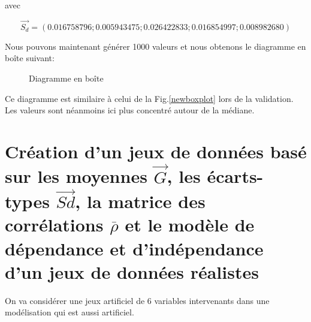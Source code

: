 \documentclass[a4paper]{article}
\begin{document}
\begin{appendices}
\begin{figure}[H]
\begin{tabular}{llll}
\end{tabular}
\end{figure}

avec 

$$\vec{S_{d}}=(0.016758796; 0.005943475; 0.026422833; 0.016854997; 0.008982680)$$

Nous pouvons maintenant générer 1000 valeurs et nous obtenons le diagramme en boîte suivant:

 \begin{figure}[H] 
    \center 
    \caption{Diagramme en boîte } 
\end{figure} 

Ce diagramme est similaire à celui de la Fig.\ref{newboxplot}  lors de la validation. Les valeurs sont néanmoins ici plus concentré autour de la médiane.
































\newpage

\section{Création d'un jeux de données basé sur les moyennes $\vec{G}$, les écarts-types $\vec{Sd}$, la matrice des corrélations $\overline{\rho}$ et le modèle de dépendance et d'indépendance d'un jeux de données réalistes}
\label{creat_stat}
On va considérer une jeux artificiel  de 6 variables intervenants dans une modélisation qui est aussi artificiel.


\end{appendices}
\end{document}
